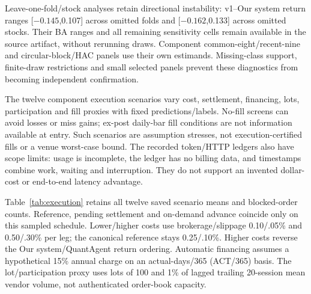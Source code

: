 Leave-one-fold/stock analyses retain directional instability: v1--Our system
return ranges [$-0.145$,0.107] across omitted folds and [$-0.162$,0.133]
across omitted stocks. Their BA ranges and all remaining sensitivity
cells remain available in the source artifact, without rerunning draws.
Component common-eight/recent-nine and circular-block/HAC panels use
their own estimands. Missing-class support, finite-draw restrictions and
small selected panels prevent these diagnostics from becoming independent
confirmation.

The twelve component execution scenarios vary cost, settlement, financing,
lots, participation and fill proxies with fixed predictions/labels.
No-fill screens can avoid losses or miss gains; ex-post daily-bar fill
conditions are not information available at entry. Such scenarios are
assumption stresses, not execution-certified fills or a venue worst-case
bound. The recorded token/HTTP ledgers also have scope limits: usage
is incomplete, the ledger has no billing data, and timestamps combine
work, waiting and interruption. They do not support an invented dollar-cost
or end-to-end latency advantage.


Table~\ref{tab:execution} retains all twelve saved scenario means and
blocked-order counts. Reference, pending settlement and on-demand
advance coincide only on this sampled schedule. Lower/higher costs use
brokerage/slippage 0.10/.05\% and 0.50/.30\% per leg; the canonical reference
stays 0.25/.10\%. Higher costs reverse the Our system/QuantAgent return ordering.
Automatic financing assumes a hypothetical 15\% annual charge on an
actual-days/365 (ACT/365) basis.
The lot/participation proxy uses lots of 100 and 1\% of lagged trailing
20-session mean vendor volume, not authenticated order-book capacity.

